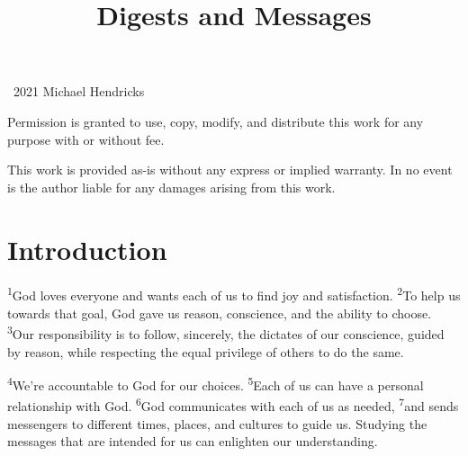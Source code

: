 \documentclass[openany,12pt,english]{book}
\title{Di\-gests and Mes\-sages}
\author{}
\date{}
\newenvironment{para}{\par\pretolerance=100\tolerance=200\setlength{\emergencystretch}{0.6em}\relax}{\par}
\begin{document}
\maketitle

{
\thispagestyle{empty}
\vspace*{\fill}
\begin{center}
\textcopyright{}~2021 Michael Hendricks

\vspace{0.5\baselineskip}

Permission is granted to use, copy, modify, and distribute
this work for any purpose with or without fee.

\vspace{0.5\baselineskip}

This work is provided as-is without any express or implied
warranty. In no event is the author liable for any damages
arising from this work.
\end{center}
}

\tableofcontents

\markboth{}{}


\chapter*{Introduction}
\begin{para}
    \textsuperscript{1}\thinspace{}God loves eve\-ry\-one and wants each of us to find joy and sat\-is\-fac\-tion.
    \textsuperscript{2}\thinspace{}To help us to\-wards that goal, God gave us rea\-son, con\-science, and the a\-bil\-i\-ty to choose.
    \textsuperscript{3}\thinspace{}Our re\-spon\-si\-bil\-i\-ty is to fol\-low, sin\-cere\-ly, the dictates of our con\-science, guid\-ed by rea\-son, while re\-spect\-ing the e\-qual priv\-i\-lege of others to do the same.
\end{para}

\begin{para}
    \textsuperscript{4}\thinspace{}We're ac\-count\-a\-ble to God for our choices.
    \textsuperscript{5}\thinspace{}Each of us can have a per\-son\-al re\-la\-tion\-ship with God.
    \textsuperscript{6}\thinspace{}God communicates with each of us as needed,
    \textsuperscript{7}\thinspace{}and sends messengers to dif\-fer\-ent times, places, and cultures to guide us. Stud\-y\-ing the messages that are in\-tend\-ed for us can en\-light\-en our un\-der\-stand\-ing.
\end{para}
\end{document}
